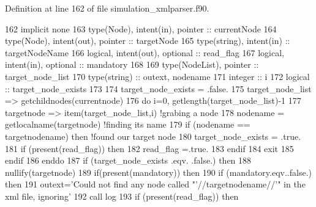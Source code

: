 Definition at line 162 of file simulation\+\_\+xmlparser.\+f90.


\begin{DoxyCode}
162     \textcolor{keywordtype}{implicit none}
163     \textcolor{keywordtype}{type}(Node), \textcolor{keywordtype}{intent(in)}, \textcolor{keywordtype}{pointer} :: currentNode
164     \textcolor{keywordtype}{type}(Node), \textcolor{keywordtype}{intent(out)}, \textcolor{keywordtype}{pointer} :: targetNode
165     \textcolor{keywordtype}{type}(string), \textcolor{keywordtype}{intent(in)} :: targetNodeName
166     \textcolor{keywordtype}{logical}, \textcolor{keywordtype}{intent(out)}, \textcolor{keywordtype}{optional} :: read\_flag
167     \textcolor{keywordtype}{logical}, \textcolor{keywordtype}{intent(in)}, \textcolor{keywordtype}{optional} :: mandatory
168 
169     \textcolor{keywordtype}{type}(NodeList), \textcolor{keywordtype}{pointer} :: target\_node\_list
170     \textcolor{keywordtype}{type}(string) :: outext, nodename
171     \textcolor{keywordtype}{integer} :: i
172     \textcolor{keywordtype}{logical} :: target\_node\_exists
173 
174     target\_node\_exists = .false.
175     target\_node\_list => getchildnodes(currentnode)
176     \textcolor{keywordflow}{do} i=0, getlength(target\_node\_list)-1
177         targetnode => item(target\_node\_list,i) \textcolor{comment}{!grabing a node}
178         nodename = getlocalname(targetnode)  \textcolor{comment}{!finding its name}
179         \textcolor{keywordflow}{if} (nodename == targetnodename) \textcolor{keywordflow}{then} \textcolor{comment}{!found our target node}
180             target\_node\_exists = .true.
181             \textcolor{keywordflow}{if} (\textcolor{keyword}{present}(read\_flag)) \textcolor{keywordflow}{then}
182               read\_flag =.true.
183 \textcolor{keywordflow}{            endif}
184             \textcolor{keywordflow}{exit}
185 \textcolor{keywordflow}{        endif}
186 \textcolor{keywordflow}{    enddo}
187     \textcolor{keywordflow}{if} (target\_node\_exists .eqv. .false.) \textcolor{keywordflow}{then}
188         \textcolor{keyword}{nullify}(targetnode)
189         \textcolor{keywordflow}{if}(\textcolor{keyword}{present}(mandatory)) \textcolor{keywordflow}{then}
190           \textcolor{keywordflow}{if} (mandatory.eqv..false.) \textcolor{keywordflow}{then}
191             outext=\textcolor{stringliteral}{'Could not find any node called "'}//targetnodename//\textcolor{stringliteral}{'" in the xml file, ignoring'}
192             \textcolor{keyword}{call }log%
193             \textcolor{keywordflow}{if} (\textcolor{keyword}{present}(read\_flag)) \textcolor{keywordflow}{then}

\end{DoxyCode}
